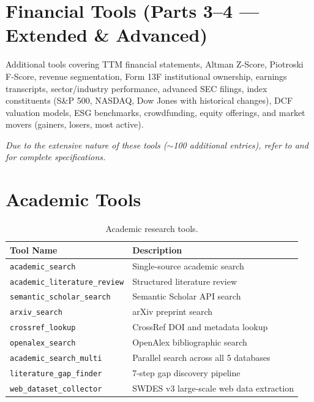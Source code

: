 \section{Financial Tools (Parts 3--4 --- Extended \& Advanced)}
\label{sec:tools:fin-ext}

Additional tools covering TTM financial statements, Altman Z-Score, Piotroski F-Score, revenue segmentation, Form 13F institutional ownership, earnings transcripts, sector/industry performance, advanced SEC filings, index constituents (S\&P 500, NASDAQ, Dow Jones with historical changes), DCF valuation models, ESG benchmarks, crowdfunding, equity offerings, and market movers (gainers, losers, most active).

\emph{Due to the extensive nature of these tools ($\sim$100 additional entries), refer to  and  for complete specifications.}

\section{Academic Tools}
\label{sec:tools:academic}

\begin{longtable}{p{5cm}p{8cm}}
\caption{Academic research tools.} \label{tab:tools-academic} \\
\toprule
\textbf{Tool Name} & \textbf{Description} \\
\midrule
\endfirsthead
\texttt{academic\_search} & Single-source academic search \\
\texttt{academic\_literature\_review} & Structured literature review \\
\texttt{semantic\_scholar\_search} & Semantic Scholar API search \\
\texttt{arxiv\_search} & arXiv preprint search \\
\texttt{crossref\_lookup} & CrossRef DOI and metadata lookup \\
\texttt{openalex\_search} & OpenAlex bibliographic search \\
\texttt{academic\_search\_multi} & Parallel search across all 5 databases \\
\texttt{literature\_gap\_finder} & 7-step gap discovery pipeline \\
\texttt{web\_dataset\_collector} & SWDES v3 large-scale web data extraction \\
\bottomrule
\end{longtable}

